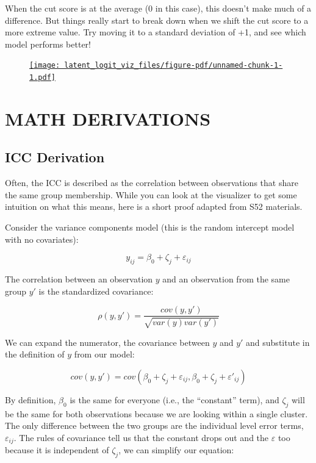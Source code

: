 \documentclass[
  letterpaper,
  DIV=11,
  numbers=noendperiod]{scrreprt}
\begin{document}
When the cut score is at the average (0 in this case), this doesn't make
much of a difference. But things really start to break down when we
shift the cut score to a more extreme value. Try moving it to a standard
deviation of +1, and see which model performs better!

\begin{figure}

{\centering 

\href{https://s43dnt-josh-gilbert.shinyapps.io/s43_latent_logit_viz/}{\texttt{[image: latent\_logit\_viz\_files/figure-pdf/unnamed-chunk-1-1.pdf]}}

}

\end{figure}

\part{MATH DERIVATIONS}

\hypertarget{icc-derivation}{%
\chapter{ICC Derivation}\label{icc-derivation}}

Often, the ICC is described as the correlation between observations that
share the same group membership. While you can look at the visualizer to
get some intuition on what this means, here is a short proof adapted
from S52 materials.

Consider the variance components model (this is the random intercept
model with no covariates):

\[
y_{ij} = \beta_0 + \zeta_j + \varepsilon_{ij}
\]

The correlation between an observation \(y\) and an observation from the
same group \(y'\) is the standardized covariance:

\[
\rho(y, y') = \frac{cov(y,y')}{\sqrt{var(y)var(y')}}
\]

We can expand the numerator, the covariance between \(y\) and \(y'\) and
substitute in the definition of \(y\) from our model:

\[
cov(y,y') = cov(\beta_0 + \zeta_j + \varepsilon_{ij}, \beta_0 + \zeta_j + \varepsilon'_{ij})
\]

By definition, \(\beta_0\) is the same for everyone (i.e., the
``constant'' term), and \(\zeta_j\) will be the same for both
observations because we are looking within a single cluster. The only
difference between the two groups are the individual level error terms,
\(\varepsilon_{ij}\). The rules of covariance tell us that the constant
drops out and the \(\varepsilon\) too because it is independent of
\(\zeta_j\), we can simplify our equation:
\end{document}
